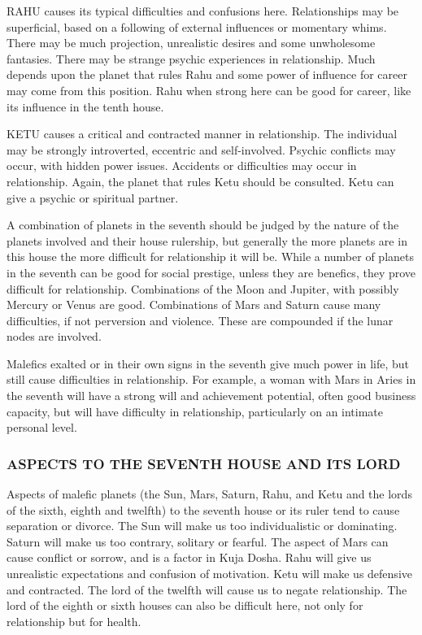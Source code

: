  

RAHU causes its typical difficulties and confusions here. Relationships may be superficial, based on a following of external influences or momentary whims. There may be much projection, unrealistic desires and some unwholesome fantasies. There may be strange psychic experiences in relationship. Much depends upon the planet that rules Rahu and some power of influence for career may come from this position. Rahu when strong here can be good for career, like its influence in the tenth house.

 

KETU causes a critical and contracted manner in relationship. The individual may be strongly introverted, eccentric and self-involved. Psychic conflicts may occur, with hidden power issues. Accidents or difficulties may occur in relationship. Again, the planet that rules Ketu should be consulted. Ketu can give a psychic or spiritual partner.

 

A combination of planets in the seventh should be judged by the nature of the planets involved and their house rulership, but generally the more planets are in this house the more difficult for relationship it will be. While a number of planets in the seventh can be good for social prestige, unless they are benefics, they prove difficult for relationship. Combinations of the Moon and Jupiter, with possibly Mercury or Venus are good. Combinations of Mars and Saturn cause many difficulties, if not perversion and violence. These are compounded if the lunar nodes are involved.

 

Malefics exalted or in their own signs in the seventh give much power in life, but still cause difficulties in relationship. For example, a woman with Mars in Aries in the seventh will have a strong will and achievement potential, often good business capacity, but will have difficulty in relationship, particularly on an intimate personal level.

 

\subsubsection{ASPECTS TO THE SEVENTH HOUSE AND ITS LORD}

 

Aspects of malefic planets (the Sun, Mars, Saturn, Rahu, and Ketu and the lords of the sixth, eighth and twelfth) to the seventh house or its ruler tend to cause separation or divorce. The Sun will make us too individualistic or dominating. Saturn will make us too contrary, solitary or fearful. The aspect of Mars can cause conflict or sorrow, and is a factor in Kuja Dosha. Rahu will give us unrealistic expectations and confusion of motivation. Ketu will make us defensive and contracted. The lord of the twelfth will cause us to negate relationship. The lord of the eighth or sixth houses can also be difficult here, not only for relationship but for health.

